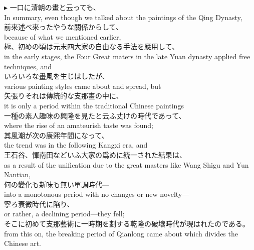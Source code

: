 \documentclass{ctexart}
\makeatletter
\newcommand*{\shifttext}[1]{%
  \settowidth{\@tempdima}{#1}%
  \hspace{-\@tempdima}#1%
}
\newcommand{\plabel}[1]{%
\shifttext{\textbf{#1}\quad}%
}
\newcommand{\prule}{%
\begin{center}%
\hdashrule[0.5ex]{.99\linewidth}{1pt}{1pt 2.5pt}%
\end{center}%
}
\makeatother
\begin{document}
\prule
\plabel{$\blacktriangleright$}%
一口に清朝の畫と云っても、\\
In summary, even though we talked about the paintings of the Qing Dynasty,\\
前來述べ來ったやうな關係からして、\\
because of what we mentioned earlier,\\
極、初めの頃は元末四大家の自由なる手法を應用して、\\
in the early stages, the Four Great maters in the late Yuan dynasty applied free techniques, and\\
いろいろな畫風を生じはしたが、\\
various painting styles came about and spread, but\\
矢張りそれは傳統的な支那畫の中に、\\
it is only a period within the traditional Chinese paintings\\
一種の素人趣味の興隆を見たと云ふ丈けの時代であって、\\
where the rise of an amateurish taste was found;\\
其風潮が次の康熙年間になって、\\
the trend was in the following Kangxi era, and\\
王石谷、惲南田などいふ大家の爲めに統一された結果は、\\
as a result of the unification due to the great masters like Wang Shigu and Yun Nantian,\\
何の變化も新味も無い單調時代---\\
into a monotonous period with no changes or new novelty---\\
寧ろ衰微時代に陷り、\\
or rather, a declining period---they fell;\\
そこに初めて支那藝術に一時期を劃する乾隆の破壤時代が現はれたのである。\\
from this on, the breaking period of Qianlong came about which divides the Chinese art. 
\end{document}
